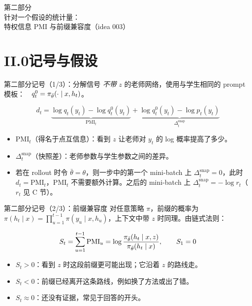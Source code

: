 \begin{frame}[standout]
第二部分\\[6pt]
{\normalsize 针对一个假设的统计量：\\ 特权信息 PMI 与前缀兼容度（idea 003）}
\end{frame}

\section{II.0\quad 记号与假设}

\begin{frame}{第二部分记号（1/3）：分解信号}
\emph{不带} $z$ 的老师网络，使用与学生相同的 prompt 模板：\ \ $q^0_t=\pi_{\bar\theta}(\cdot\mid x,h_t)$。
\begin{eqbox}
\[
d_t=\underbrace{\log q_t(y_t)-\log q^0_t(y_t)}_{\mathrm{PMI}_t}
+\underbrace{\log q^0_t(y_t)-\log p_t(y_t)}_{\Delta^{\mathrm{snap}}_t}
\]
\end{eqbox}
\begin{itemize}
  \setlength\itemsep{3pt}
  \item $\mathrm{PMI}_t$（得名于点互信息）：看到 $z$ 让老师对 $y_t$ 的 log 概率提高了多少。
  \item $\Delta^{\mathrm{snap}}_t$（快照差）：老师参数与学生参数之间的差异。
  \item 若在 rollout 时令 $\bar\theta=\theta$，则一步中的第一个 mini-batch 上 $\Delta^{\mathrm{snap}}_t=0$，此时 $d_t=\mathrm{PMI}_t$，$\mathrm{PMI}_t$ 不需要额外计算。之后的 mini-batch 上 $\Delta^{\mathrm{snap}}_t=-\log r_t$（$r_t$ 见 C 节）。
\end{itemize}
\end{frame}

\begin{frame}{第二部分记号（2/3）：前缀兼容度}
对任意策略 $\pi$，前缀的概率为 $\pi(h_t\mid x)=\prod_{u=1}^{t-1}\pi(y_u\mid x,h_u)$，上下文中带 $z$ 时同理。由链式法则：
\begin{eqbox}
\[
S_t=\sum_{u=1}^{t-1}\mathrm{PMI}_u=\log\frac{\pi_{\bar\theta}(h_t\mid x,z)}{\pi_{\bar\theta}(h_t\mid x)},\qquad S_1=0
\]
\end{eqbox}
\begin{itemize}
  \setlength\itemsep{3pt}
  \item $S_t>0$：看到 $z$ 时这段前缀更可能出现；它沿着 $z$ 的路线走。
  \item $S_t<0$：前缀已经离开这条路线，例如换了方法或出了错。
  \item $S_t\approx0$：还没有证据，常见于回答的开头。
\end{itemize}
\end{frame}

